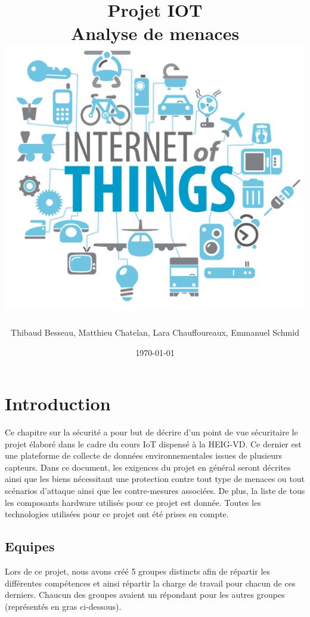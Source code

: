 \documentclass[12pt]{article}
\title{
  \vspace{-0.5cm}
  \huge{Projet IOT} \\
  \vspace{5mm}
  \Large{Analyse de menaces} \\
  \vspace{2.5cm}
  \includegraphics[width=.7\textwidth]{logo}
  \vspace{3cm}
}
\author{Thibaud Besseau, Matthieu Chatelan, Lara Chauffoureaux, Emmanuel Schmid}
\date{\today}
\begin{document}
\maketitle
\thispagestyle{empty}
\clearpage
\tableofcontents
\clearpage
\listoffigures
\clearpage
\headsep=20pt

\section{Introduction}
Ce chapitre sur la sécurité a pour but de décrire d'un point de vue sécuritaire le projet élaboré dans le cadre du cours IoT dispensé à la HEIG-VD. Ce dernier est une plateforme de collecte de données environnementales issues de plusieurs capteurs. Dans ce document, les exigences du projet en général seront décrites ainsi que les biens nécessitant une protection contre tout type de menaces ou tout scénarios d'attaque ainsi que les contre-mesures associées. De plus, la liste de tous les composants hardware utilisés pour ce projet est donnée. Toutes les technologies utilisées pour ce projet ont été prises en compte.

\subsection{Equipes}
Lors de ce projet, nous avons créé 5 groupes distincts afin de répartir les différentes compétences et ainsi répartir la charge de travail pour chacun de ces derniers. Chaucun des groupes avaient un répondant pour les autres groupes (représentés en gras ci-dessous).
\end{document}
